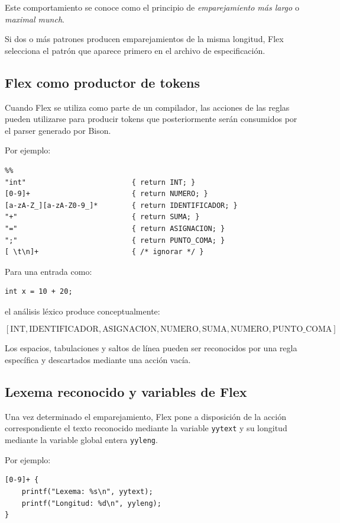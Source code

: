 \documentclass{article}
\begin{document}
Este comportamiento se conoce como el principio de
\textit{emparejamiento más largo} o \textit{maximal munch}.

Si dos o más patrones producen emparejamientos de la misma longitud,
Flex selecciona el patrón que aparece primero en el archivo de
especificación.

\subsection{Flex como productor de tokens}

Cuando Flex se utiliza como parte de un compilador, las acciones de las
reglas pueden utilizarse para producir tokens que posteriormente serán
consumidos por el parser generado por Bison.

Por ejemplo:

\begin{verbatim}
%%
"int"                         { return INT; }
[0-9]+                        { return NUMERO; }
[a-zA-Z_][a-zA-Z0-9_]*        { return IDENTIFICADOR; }
"+"                           { return SUMA; }
"="                           { return ASIGNACION; }
";"                           { return PUNTO_COMA; }
[ \t\n]+                      { /* ignorar */ }
\end{verbatim}

Para una entrada como:

\begin{verbatim}
int x = 10 + 20;
\end{verbatim}

el análisis léxico produce conceptualmente:

\[
[
\text{INT},
\text{IDENTIFICADOR},
\text{ASIGNACION},
\text{NUMERO},
\text{SUMA},
\text{NUMERO},
\text{PUNTO\_COMA}
]
\]

Los espacios, tabulaciones y saltos de línea pueden ser reconocidos por
una regla específica y descartados mediante una acción vacía.

\subsection{Lexema reconocido y variables de Flex}

Una vez determinado el emparejamiento, Flex pone a disposición de la
acción correspondiente el texto reconocido mediante la variable
\texttt{yytext} y su longitud mediante la variable global entera
\texttt{yyleng}.

Por ejemplo:

\begin{verbatim}
[0-9]+ {
    printf("Lexema: %s\n", yytext);
    printf("Longitud: %d\n", yyleng);
}
\end{verbatim}
\end{document}
